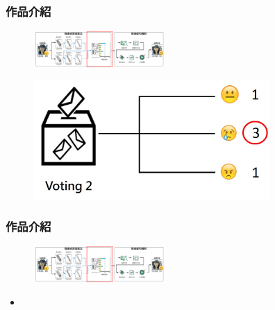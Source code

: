 \documentclass[10pt, conference, compsocconf]{beamer}
\begin{document}
\begin{CJK}{UTF8}{}
\begin{frame}
\end{frame}

\begin{frame}
\frametitle{作品介紹}
\begin{figure}[t]
\begin{flushright}
\includegraphics[width=5cm]{./Figures/framework3.pdf}
\end{flushright}
\end{figure}

\vspace{-5mm}
\begin{figure}[!t]
\begin{center}
\includegraphics[width=9cm]{./Figures/503.jpg}
\end{center}
\end{figure}

\end{frame}

\begin{frame}
\frametitle{作品介紹}

\begin{figure}[t]
\begin{flushright}
\includegraphics[width=5cm]{./Figures/framework3.pdf}
\end{flushright}
\end{figure}

\vspace{-5mm}

\begin{itemize}
\item {}
\end{itemize}



\end{frame}
\end{CJK}
\end{document}
